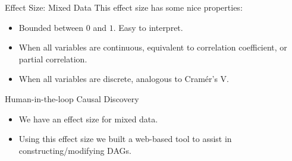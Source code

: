 \documentclass{beamer}
\begin{document}
\begin{frame}{Effect Size: Mixed Data}
	This effect size has some nice properties:
	\begin{itemize}
		\item Bounded between $ 0 $ and $ 1 $. Easy to interpret.
		\item When all variables are continuous, equivalent to correlation coefficient, or partial correlation.
		\item When all variables are discrete, analogous to Cram\'er's V.
	\end{itemize}
\end{frame}
\begin{frame}{Human-in-the-loop Causal Discovery}
	\begin{itemize}
		\item We have an effect size for mixed data.
		\item Using this effect size we built a web-based tool to assist in constructing/modifying DAGs.
	\end{itemize}
\end{frame}
\end{document}
